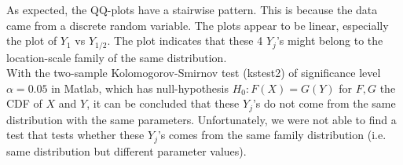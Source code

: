 As expected, the QQ-plots have a stairwise pattern. 
This is because the data came from a discrete random variable. 
The plots appear to be linear, especially the plot of $Y_{1}$ vs $Y_{1/2}$. 
The plot indicates that these 4 $Y_j$'s might belong to the location-scale family of the same distribution.\\

With the two-sample Kolomogorov-Smirnov test (kstest2) of significance level $\alpha=0.05$ in Matlab, which has null-hypothesis $H_0:F(X)=G(Y)$ for $F,G$ the CDF of $X$ and $Y$, it can be concluded that these $Y_j$'s do not come from the same distribution with the same parameters. 
Unfortunately, we were not able to find a test that tests whether these $Y_j$'s comes from the same family distribution (i.e. same distribution but different parameter values).\\




